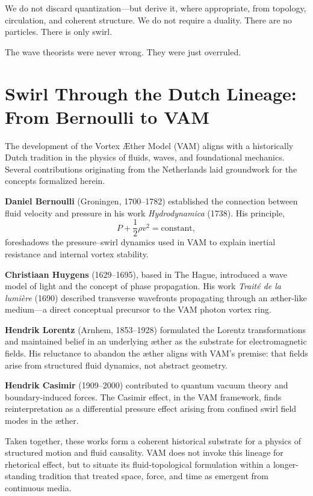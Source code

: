 We do not discard quantization—but derive it, where appropriate, from topology, circulation, and coherent structure. We do not require a duality. There are no particles. There is only swirl.

The wave theorists were never wrong. They were just overruled.


\section*{Swirl Through the Dutch Lineage: From Bernoulli to VAM}

The development of the Vortex \AE ther Model (VAM) aligns with a historically Dutch tradition in the physics of fluids, waves, and foundational mechanics. Several contributions originating from the Netherlands laid groundwork for the concepts formalized herein.

\textbf{Daniel Bernoulli} (Groningen, 1700–1782) established the connection between fluid velocity and pressure in his work \textit{Hydrodynamica} (1738). His principle,
\[
    P + \frac{1}{2} \rho v^2 = \text{constant},
\]
foreshadows the pressure–swirl dynamics used in VAM to explain inertial resistance and internal vortex stability.

\textbf{Christiaan Huygens} (1629–1695), based in The Hague, introduced a wave model of light and the concept of phase propagation. His work \textit{Traité de la lumière} (1690) described transverse wavefronts propagating through an æther-like medium—a direct conceptual precursor to the VAM photon vortex ring.

\textbf{Hendrik Lorentz} (Arnhem, 1853–1928) formulated the Lorentz transformations and maintained belief in an underlying æther as the substrate for electromagnetic fields. His reluctance to abandon the æther aligns with VAM's premise: that fields arise from structured fluid dynamics, not abstract geometry.

\textbf{Hendrik Casimir} (1909–2000) contributed to quantum vacuum theory and boundary-induced forces. The Casimir effect, in the VAM framework, finds reinterpretation as a differential pressure effect arising from confined swirl field modes in the æther.

Taken together, these works form a coherent historical substrate for a physics of structured motion and fluid causality. VAM does not invoke this lineage for rhetorical effect, but to situate its fluid-topological formulation within a longer-standing tradition that treated space, force, and time as emergent from continuous media.
